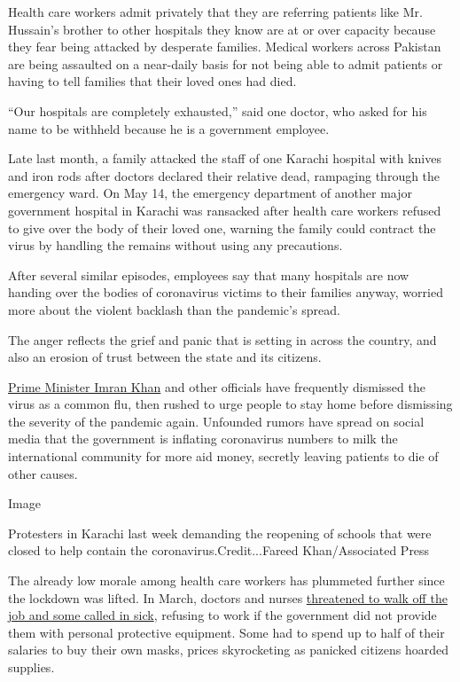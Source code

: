 Health care workers admit privately that they are referring patients
like Mr. Hussain's brother to other hospitals they know are at or over
capacity because they fear being attacked by desperate families. Medical
workers across Pakistan are being assaulted on a near-daily basis for
not being able to admit patients or having to tell families that their
loved ones had died.

``Our hospitals are completely exhausted,'' said one doctor, who asked
for his name to be withheld because he is a government employee.

Late last month, a family attacked the staff of one Karachi hospital
with knives and iron rods after doctors declared their relative dead,
rampaging through the emergency ward. On May 14, the emergency
department of another major government hospital in Karachi was ransacked
after health care workers refused to give over the body of their loved
one, warning the family could contract the virus by handling the remains
without using any precautions.

After several similar episodes, employees say that many hospitals are
now handing over the bodies of coronavirus victims to their families
anyway, worried more about the violent backlash than the pandemic's
spread.

The anger reflects the grief and panic that is setting in across the
country, and also an erosion of trust between the state and its
citizens.

\href{https://www.nytimes.com/2020/06/26/world/asia/pakistan-imran-khan-bin-laden-martyr.html}{Prime
Minister Imran Khan} and other officials have frequently dismissed the
virus as a common flu, then rushed to urge people to stay home before
dismissing the severity of the pandemic again. Unfounded rumors have
spread on social media that the government is inflating coronavirus
numbers to milk the international community for more aid money, secretly
leaving patients to die of other causes.

Image

Protesters in Karachi last week demanding the reopening of schools that
were closed to help contain the coronavirus.Credit...Fareed
Khan/Associated Press

The already low morale among health care workers has plummeted further
since the lockdown was lifted. In March, doctors and nurses
\href{https://www.nytimes.com/2020/03/26/world/asia/pakistan-coronavirus-tablighi-jamaat.html}{threatened
to walk off the job and some called in sick}, refusing to work if the
government did not provide them with personal protective equipment. Some
had to spend up to half of their salaries to buy their own masks, prices
skyrocketing as panicked citizens hoarded supplies.

